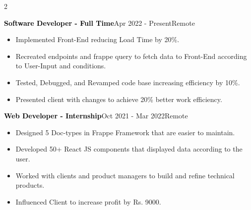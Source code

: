 \documentclass[10pt,a4paper,ragged2e,withhyper]{altacv}
\begin{document}
\begin{paracol}{2}


 {\textcolor{Black}{{\textbf{Software Developer - Full Time}}}}{Apr 2022 - Present}{Remote}
\begin{itemize}
	\item Implemented Front-End reducing Load Time by 20\%.
	\item Recreated endpoints and frappe query to fetch data to
	Front-End according to User-Input and conditions.
	\item Tested, Debugged, and Revamped code base increasing
	efficiency by 10\%.
	\item Presented client with changes to achieve 20\% better work efficiency.
\end{itemize}
\cvevent{} {\textcolor{Black}{{\textbf{Web Developer - Internship}}}}{Oct 2021 - Mar 2022}{Remote}
\begin{itemize}
	\item Designed 5 Doc-types in Frappe Framework that are easier to maintain.
	\item Developed 50+ React JS components that displayed data according to the user.
\end{itemize}
\vspace{-10pt}
\divider
\vspace{-5pt}
%	

\begin{itemize}
	\item Worked with clients and product managers to build and refine technical products.
	\item Influenced Client to increase profit by Rs. 9000.
\end{itemize}

\vspace{-5pt}



\end{paracol}
\end{document}

